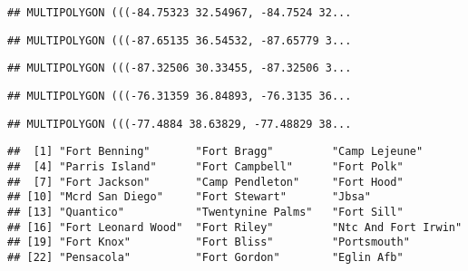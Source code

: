 \documentclass[
]{article}
\newenvironment{Shaded}{\begin{snugshade}}{\end{snugshade}}
\newcommand{\AttributeTok}[1]{\textcolor[rgb]{0.77,0.63,0.00}{#1}}
\newcommand{\CommentTok}[1]{\textcolor[rgb]{0.56,0.35,0.01}{\textit{#1}}}
\newcommand{\FunctionTok}[1]{\textcolor[rgb]{0.00,0.00,0.00}{#1}}
\newcommand{\NormalTok}[1]{#1}
\newcommand{\OtherTok}[1]{\textcolor[rgb]{0.56,0.35,0.01}{#1}}
\newcommand{\SpecialCharTok}[1]{\textcolor[rgb]{0.00,0.00,0.00}{#1}}
\newcommand{\StringTok}[1]{\textcolor[rgb]{0.31,0.60,0.02}{#1}}
\begin{document}
\begin{verbatim}
## MULTIPOLYGON (((-84.75323 32.54967, -84.7524 32...
\end{verbatim}

\begin{verbatim}
## MULTIPOLYGON (((-87.65135 36.54532, -87.65779 3...
\end{verbatim}

\begin{verbatim}
## MULTIPOLYGON (((-87.32506 30.33455, -87.32506 3...
\end{verbatim}

\begin{verbatim}
## MULTIPOLYGON (((-76.31359 36.84893, -76.3135 36...
\end{verbatim}

\begin{verbatim}
## MULTIPOLYGON (((-77.4884 38.63829, -77.48829 38...
\end{verbatim}

\begin{Shaded}
\end{Shaded}

\begin{verbatim}
##  [1] "Fort Benning"       "Fort Bragg"         "Camp Lejeune"      
##  [4] "Parris Island"      "Fort Campbell"      "Fort Polk"         
##  [7] "Fort Jackson"       "Camp Pendleton"     "Fort Hood"         
## [10] "Mcrd San Diego"     "Fort Stewart"       "Jbsa"              
## [13] "Quantico"           "Twentynine Palms"   "Fort Sill"         
## [16] "Fort Leonard Wood"  "Fort Riley"         "Ntc And Fort Irwin"
## [19] "Fort Knox"          "Fort Bliss"         "Portsmouth"        
## [22] "Pensacola"          "Fort Gordon"        "Eglin Afb"
\end{verbatim}
\end{document}
